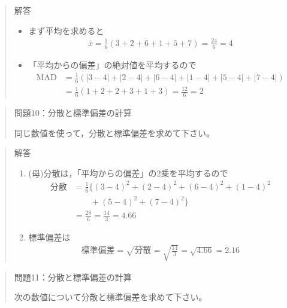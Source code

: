 \documentclass[
]{book}
\theoremstyle{definition}
\theoremstyle{definition}
\theoremstyle{definition}
\theoremstyle{definition}
\theoremstyle{remark}
\begin{document}
\begin{quote}
解答

\begin{itemize}
\item
  まず平均を求めると
  \begin{align*}
  \bar{x}=\frac{1}{6}(3+2+6+1+5+7)=\frac{24}{6}=4
  \end{align*}
\item
  「平均からの偏差」の絶対値を平均するので
  \begin{align*}
  \text{MAD}
  &=\frac{1}{6}(|3-4|+|2-4|+|6-4|+|1-4|+|5-4|+|7-4|) \\
  &=\frac{1}{6}(1+2+2+3+1+3)=\frac{12}{6}=2
  \end{align*}
\end{itemize}
\end{quote}

\begin{quote}
問題10：分散と標準偏差の計算

同じ数値を使って，分散と標準偏差を求めて下さい。
\end{quote}

\begin{quote}
解答

\begin{enumerate}
\def\labelenumi{\arabic{enumi}.}
\item
  (母)分散は，「平均からの偏差」の2乗を平均するので
  \begin{align*}
  \text{分散}
  &=\frac{1}{6}\{ (3-4)^2+(2-4)^2+(6-4)^2+(1-4)^2 \\
  & \qquad+(5-4)^2+(7-4)^2 \}\\
  &=\frac{28}{6}=\frac{14}{3}=4.66
  \end{align*}
\item
  標準偏差は
  \begin{align*}
  \text{標準偏差}=\sqrt{\text{分散}}=\sqrt{\frac{14}{3}}=\sqrt{4.66}=2.16
  \end{align*}
\end{enumerate}
\end{quote}

\begin{quote}
問題11：分散と標準偏差の計算

次の数値について分散と標準偏差を求めて下さい。
\end{quote}
\end{document}
